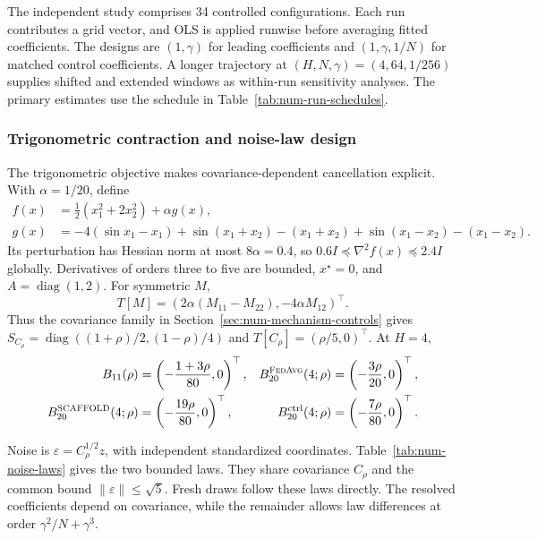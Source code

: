 The independent study comprises 34 controlled configurations.
Each run contributes a grid vector, and OLS is applied runwise before
averaging fitted coefficients. The designs are $(1,\gamma)$ for leading
coefficients and $(1,\gamma,1/N)$ for matched control coefficients.
A longer trajectory at $(H,N,\gamma)=(4,64,1/256)$ supplies shifted and
extended windows as within-run sensitivity analyses. The primary estimates
use the schedule in Table~\ref{tab:num-run-schedules}.

\subsubsection{Trigonometric contraction and noise-law design}
\label{app:targeted-model}

The trigonometric objective makes covariance-dependent cancellation
explicit. With $\alpha=1/20$, define
\begin{equation}
\label{eq:targeted-objective}
\begin{aligned}
f(x)&=\tfrac12(x_1^2+2x_2^2)+\alpha g(x),\\
g(x)&=-4(\sin x_1-x_1)
 +\sin(x_1+x_2)-(x_1+x_2)
 +\sin(x_1-x_2)-(x_1-x_2).
\end{aligned}
\end{equation}
Its perturbation has Hessian norm at most $8\alpha=0.4$, so
$0.6I\preceq\nabla^2 f(x)\preceq2.4I$ globally. Derivatives of orders
three to five are bounded, $x^\star=0$, and $A=\operatorname{diag}(1,2)$.
For symmetric $M$,
\[
T[M]=(2\alpha(M_{11}-M_{22}),-4\alpha M_{12})^\top.
\]
Thus the covariance family in Section~\ref{sec:num-mechanism-controls}
gives $S_{C_\rho}=\operatorname{diag}((1+\rho)/2,(1-\rho)/4)$ and
$T[C_\rho]=(\rho/5,0)^\top$. At $H=4$,
\begin{equation}
\label{eq:targeted-coefficients}
\begin{aligned}
 B_{11}(\rho)&=\left(-\frac{1+3\rho}{80},0\right)^\top,
 &B_{20}^{\textnormal{\textsc{FedAvg}}}(4;\rho)&=\left(-\frac{3\rho}{20},0\right)^\top,\\
 B_{20}^{\textnormal{\textsc{SCAFFOLD}}}(4;\rho)&=\left(-\frac{19\rho}{80},0\right)^\top,
 &B_{20}^{\mathrm{ctrl}}(4;\rho)&=\left(-\frac{7\rho}{80},0\right)^\top.
\end{aligned}
\end{equation}

Noise is $\varepsilon=C_\rho^{1/2}z$, with independent standardized
coordinates. Table~\ref{tab:num-noise-laws} gives the two bounded laws.
They share covariance $C_\rho$ and the common bound
$\|\varepsilon\|\le\sqrt5$. Fresh draws follow these laws directly.
The resolved coefficients depend on covariance, while the remainder
allows law differences at order $\gamma^2/N+\gamma^3$.

